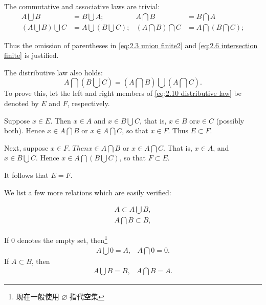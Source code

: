 The commutative and associative laws are trivial:
\begin{align}
        A \bigcup B &= B \bigcup A; &
        A \bigcap B &= B \bigcap A \label{eq:2.8 commutative} \\
        \left(A \bigcup B\right) \bigcup C &= A \bigcup \left(B \bigcup C\right); &
        \left(A \bigcap B\right) \bigcap C &= A \bigcap \left(B \bigcap C\right);\label{eq:2.9 distributive}
\end{align}

Thus the omission of parentheses in \ref{eq:2.3 union finite2} and \ref{eq:2.6 intersection finite} is justified.

The distributive law also holds:
\begin{equation}\label{eq:2.10 distributive law}
    A \bigcap \left( B \bigcup C\right) = 
    \left(A \bigcap B\right) \bigcup \left(A \bigcap C\right).
\end{equation}
To prove this, let the left and right members of \ref{eq:2.10 distributive law} be denoted by $E$ and $F$, respectively.

Suppose $x \in E$. Then $x \in A$ and $x \in B \bigcup C$, that is, $x \in B$ or$ x \in C$ (possibly both). Hence $x \in A\bigcap B$ or $x \in A\bigcap C$, so that $x \in F$. Thus $E \subset F$.

Next, suppose $x \in F$. $Thenx \in A\bigcap B$ or $x \in A\bigcap C$. That is, $x \in A$, and $x \in B\bigcup C$. Hence $x \in A\bigcap \left(B \bigcup C\right)$, so that $F \subset E$.

It follows that $E = F$.

We list a few more relations which are easily verified:

\begin{align}
    A \subset A \bigcup B, \label{eq:2.11}\\
    A \bigcap B \subset B, \label{eq:2.12}
\end{align}

If $0$ denotes the empty set, then\footnote{现在一般使用 $\varnothing$ 指代空集}
\begin{equation}
    \begin{array}{cc}
        A \bigcup 0 = A, & A \bigcap 0 = 0.
    \end{array}
\end{equation}
If $A \subset B$, then
\begin{equation}
    \begin{array}{cc}
        A \bigcup B = B, & A \bigcap B = A.
    \end{array}
\end{equation}

